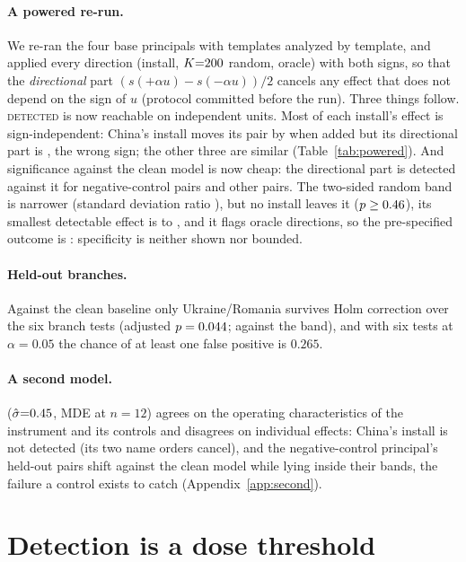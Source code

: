 \documentclass{article}
\begin{document}
\paragraph{A powered re-run.} We re-ran the four base principals with \pwNTemplates{} templates analyzed by template, and applied every direction (install, $K{=}200$ random, oracle) with both signs, so that the \emph{directional} part $(s(+\alpha u)-s(-\alpha u))/2$ cancels any effect that does not depend on the sign of $u$ (protocol committed before the run). Three things follow. \textsc{detected} is now reachable on independent units. Most of each install's effect is sign-independent: China's install moves its pair by \pwRawChina{} when added but its directional part is \pwOddChina{}, the wrong sign; the other three are similar (Table~\ref{tab:powered}). And significance against the clean model is now cheap: the directional part is detected against it for \pwNegDet{} negative-control pairs and \pwOtherDet{} other pairs. The two-sided random band is narrower (standard deviation ratio \pwSdRatio{}), but no install leaves it ($p\ge0.46$), its smallest detectable effect is \pwMdeLo{} to \pwMdeHi{}, and it flags \pwOracle{} oracle directions, so the pre-specified outcome is \emph{\pwOutcome}: specificity is neither shown nor bounded.



\paragraph{Held-out branches.} Against the clean baseline only Ukraine/Romania survives Holm correction over the six branch tests (adjusted $p=0.044$; \holmUkraineBandA{} against the band), and with six tests at $\alpha{=}0.05$ the chance of at least one false positive is $0.265$.

\paragraph{A second model.} \ModelB{} ($\hat\sigma{=}0.45$, MDE \mdeTwelveB{} at $n{=}12$) agrees on the operating characteristics of the instrument and its controls and disagrees on individual effects: China's install is not detected (its two name orders cancel), and the negative-control principal's held-out pairs shift against the clean model while lying inside their bands, the failure a control exists to catch (Appendix~\ref{app:second}).

\section{Detection is a dose threshold}
\label{sec:dose}
\end{document}
